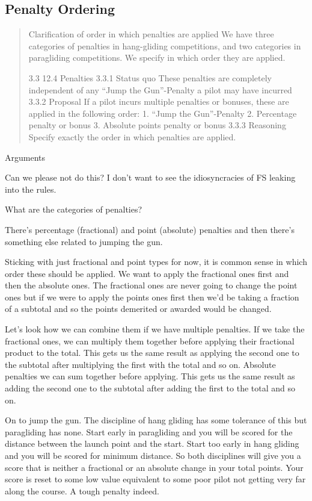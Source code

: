\documentclass{article}
\begin{document}
\label{sec:jtg}
\subsection{Penalty Ordering}


\begin{quotation}
Clarification of order in which penalties are applied
We have three categories of penalties in hang-gliding competitions, and two
categories in paragliding competitions. We specify in which order they are
applied.

3.3 12.4 Penalties
3.3.1 Status quo
 	These penalties are completely independent of any “Jump the Gun”-Penalty a pilot may have incurred
3.3.2 Proposal
     If a pilot incurs multiple penalties or bonuses, these are applied in the following order:
          1. “Jump the Gun”-Penalty
          2. Percentage penalty or bonus
          3. Absolute points penalty or bonus
     3.3.3 Reasoning
     Specify exactly the order in which penalties are applied.
\end{quotation}

Arguments

Can we please not do this? I don't want to see the idiosyncracies of FS
leaking into the rules.

What are the categories of penalties?

There's percentage (fractional) and point (absolute) penalties and then
there's something else related to jumping the gun.

Sticking with just fractional and point types for now, it is common sense in
which order these should be applied. We want to apply the fractional ones
first and then the absolute ones. The fractional ones are never going to
change the point ones but if we were to apply the points ones first then we'd
be taking a fraction of a subtotal and so the points demerited or
awarded would be changed.

Let's look how we can combine them if we have multiple penalties. If we take
the fractional ones, we can multiply them together before applying their
fractional product to the total. This gets us the same result as applying the
second one to the subtotal after multiplying the first with the total and so
on. Absolute penalties we can sum together before applying. This gets us the
same result as adding the second one to the subtotal after adding the first
to the total and so on.

On to jump the gun. The discipline of hang gliding has some tolerance of this
but paragliding has none. Start early in paragliding and you will be scored
for the distance between the launch point and the start. Start too early in
hang gliding and you will be scored for minimum distance. So both disciplines
will give you a score that is neither a fractional or an absolute change in
your total points. Your score is reset to some low value equivalent to some
poor pilot not getting very far along the course. A tough penalty indeed.
\end{document}
